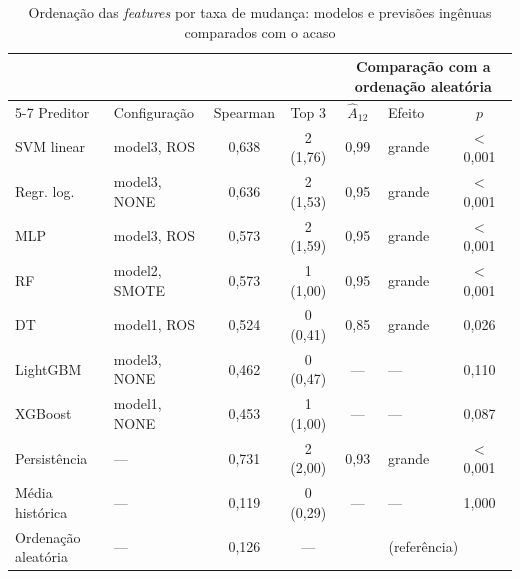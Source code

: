 \begin{table}[htbp]
    
    \centering
    \footnotesize
    \setlength{\tabcolsep}{4pt}%
    \caption{Ordenação das \textit{features} por taxa de mudança: modelos e previsões ingênuas comparados com o acaso}
    \label{tab:res-nivel-feature}
    \begin{tabular}{llccclc}
        \toprule
         & & & & \multicolumn{3}{c}{Comparação com a ordenação aleatória} \\
        \cmidrule(lr){5-7}
        Preditor & Configuração & Spearman & Top 3 & $\hat{A}_{12}$ & Efeito & $p$ \\
        \midrule
        SVM linear & model3, ROS & 0,638 & 2 (1,76) & 0,99 & grande & $<$ 0,001 \\
        Regr. log. & model3, NONE & 0,636 & 2 (1,53) & 0,95 & grande & $<$ 0,001 \\
        MLP & model3, ROS & 0,573 & 2 (1,59) & 0,95 & grande & $<$ 0,001 \\
        RF & model2, SMOTE & 0,573 & 1 (1,00) & 0,95 & grande & $<$ 0,001 \\
        DT & model1, ROS & 0,524 & 0 (0,41) & 0,85 & grande & 0,026 \\
        LightGBM & model3, NONE & 0,462 & 0 (0,47) & --- & --- & 0,110 \\
        XGBoost & model1, NONE & 0,453 & 1 (1,00) & --- & --- & 0,087 \\
        \midrule
        Persistência & --- & 0,731 & 2 (2,00) & 0,93 & grande & $<$ 0,001 \\
        Média histórica & --- & 0,119 & 0 (0,29) & --- & --- & 1,000 \\
        Ordenação aleatória & --- & 0,126 & --- & \multicolumn{3}{c}{(referência)} \\
        \bottomrule
    \end{tabular}
\end{table}%

